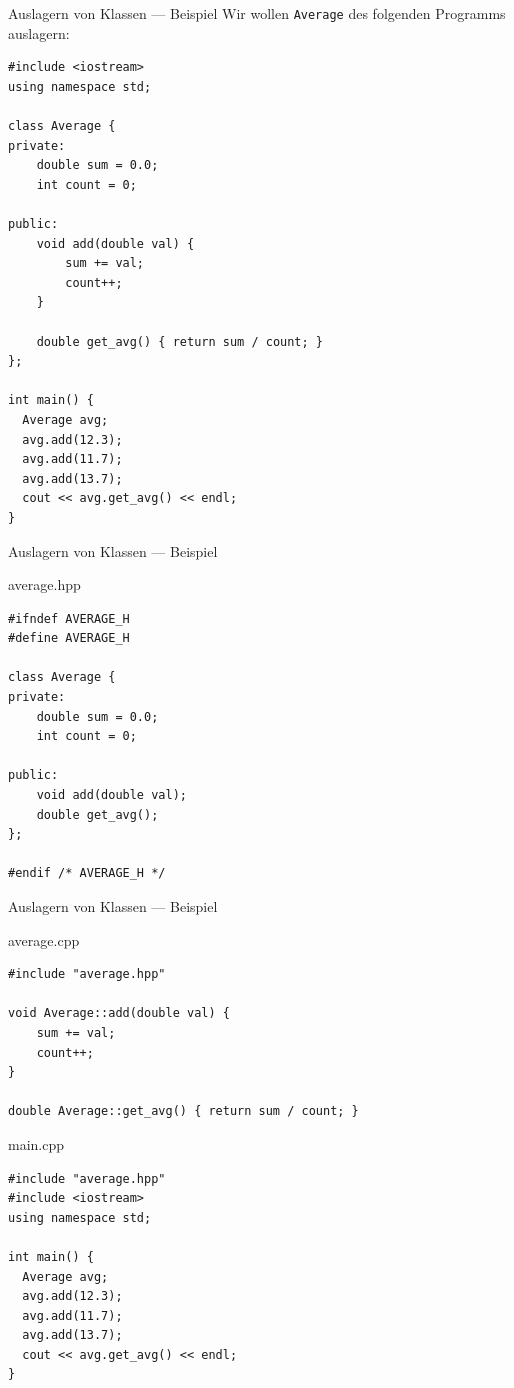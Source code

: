 \documentclass[presentation]{beamer}
\begin{document}
\begin{frame}[label={sec:org179425b},fragile]{Auslagern von Klassen --- Beispiel}
 Wir wollen {\color{solarizedYellow}\texttt{Average} }des folgenden Programms auslagern:
\begin{verbatim}
#include <iostream>
using namespace std;

class Average {
private:
    double sum = 0.0;
    int count = 0;

public:
    void add(double val) {
        sum += val;
        count++;
    }

    double get_avg() { return sum / count; }
};

int main() {
  Average avg;
  avg.add(12.3);
  avg.add(11.7);
  avg.add(13.7);
  cout << avg.get_avg() << endl;
}
\end{verbatim}
\end{frame}
\begin{frame}[label={sec:org6fa125c},fragile]{Auslagern von Klassen --- Beispiel}
 \begin{block}{average.hpp}
\begin{verbatim}
#ifndef AVERAGE_H
#define AVERAGE_H

class Average {
private:
    double sum = 0.0;
    int count = 0;

public:
    void add(double val);
    double get_avg();
};

#endif /* AVERAGE_H */
\end{verbatim}
\end{block}
\end{frame}
\begin{frame}[label={sec:org256b9ce},fragile]{Auslagern von Klassen --- Beispiel}
 \begin{block}{average.cpp}
\begin{verbatim}
#include "average.hpp"

void Average::add(double val) {
    sum += val;
    count++;
}

double Average::get_avg() { return sum / count; }
\end{verbatim}
\end{block}
\begin{block}{main.cpp}
\begin{verbatim}
#include "average.hpp"
#include <iostream>
using namespace std;

int main() {
  Average avg;
  avg.add(12.3);
  avg.add(11.7);
  avg.add(13.7);
  cout << avg.get_avg() << endl;
}
\end{verbatim}
\end{block}
\end{frame}
\end{document}
